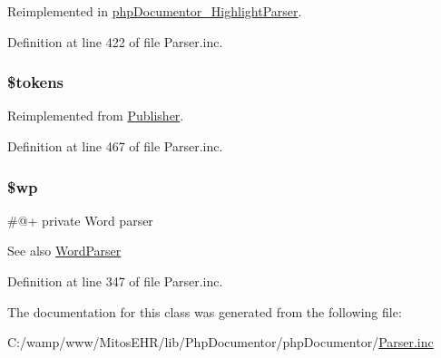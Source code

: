 \-Reimplemented in \hyperlink{classphp_documentor___highlight_parser_a29ffc8e33fce7331212a7636256a7678}{php\-Documentor\-\_\-\-Highlight\-Parser}.



\-Definition at line 422 of file \-Parser.\-inc.

\hypertarget{class_parser_a72ead29e4317fbc4335fd3ba764e8b59}{
\subsubsection[{\$tokens}]{\setlength{\rightskip}{0pt plus 5cm}\$tokens}}\label{class_parser_a72ead29e4317fbc4335fd3ba764e8b59}


\-Reimplemented from \hyperlink{class_publisher_a72ead29e4317fbc4335fd3ba764e8b59}{\-Publisher}.



\-Definition at line 467 of file \-Parser.\-inc.

\hypertarget{class_parser_ac3fb337a2f1d0065629c5bc05975a774}{
\subsubsection[{\$wp}]{\setlength{\rightskip}{0pt plus 5cm}\$wp}}\label{class_parser_ac3fb337a2f1d0065629c5bc05975a774}
\#@+  private \-Word parser \begin{DoxySeeAlso}{\-See also}
\hyperlink{class_word_parser}{\-Word\-Parser} 
\end{DoxySeeAlso}


\-Definition at line 347 of file \-Parser.\-inc.



\-The documentation for this class was generated from the following file\-:\begin{DoxyCompactItemize}
\item 
\-C\-:/wamp/www/\-Mitos\-E\-H\-R/lib/\-Php\-Documentor/php\-Documentor/\hyperlink{_parser_8inc}{\-Parser.\-inc}\end{DoxyCompactItemize}
